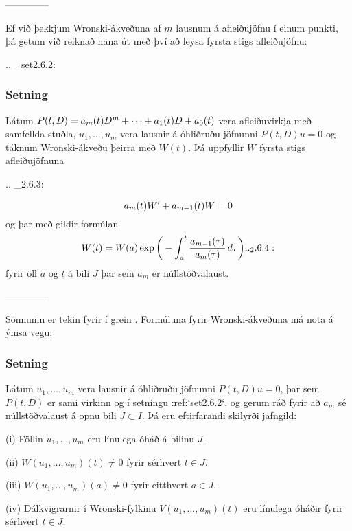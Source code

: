 --------------



Ef við þekkjum Wronski-ákveðuna af $m$ lausnum á afleiðujöfnu í einum
punkti, þá getum við reiknað hana út með því að leysa fyrsta stigs
afleiðujöfnu: 


.. _set2.6.2:

\subsubsection{Setning}
Látum
$P(t,D)=a_m(t)D\sp m+\cdots+a_1(t)D+a_0(t)$ vera afleiðuvirkja með
samfellda stuðla, $u_1,\dots,u_m$ vera lausnir á óhliðruðu jöfnunni
$P(t,D)u=0$ og táknum  Wronski-ákveðu þeirra með $W(t)$.  Þá
uppfyllir $W$ fyrsta stigs afleiðujöfnuna

.. _2.6.3:

\begin{equation*}a_m(t) W{\sp{\prime}}+a_{m-1}(t)W=0 
\end{equation*}
og þar með gildir formúlan
 \begin{equation*}W(t)=W(a)\exp\bigg(-\int_a\sp t\dfrac{a_{m-1}(\tau)}{a_m(\tau)}\,
d\tau\bigg) 

.. _2.6.4:

 \end{equation*}
fyrir öll $a$ og $t$ á bili $J$ þar sem $a_m$ er núllstöðvalaust.


--------------



Sönnunin er tekin fyrir í grein .
Formúluna fyrir Wronski-ákveðuna má nota á ýmsa vegu:

\subsubsection{Setning}
  Látum $u_1,\dots,u_m$ vera lausnir á óhliðruðu jöfnunni
$P(t,D)u=0$, þar sem $P(t,D)$ er sami virkinn og í setningu
:ref:`set2.6.2`, og gerum ráð fyrir að $a_m$ sé núllstöðvalaust á opnu bili
$J\subset I$.  Þá eru eftirfarandi skilyrði jafngild:

\item{(i)}  Föllin $u_1,\dots,u_m$ eru línulega óháð á bilinu $J$.

\item{(ii)} $W(u_1,\dots,u_m)(t)\neq 0$ fyrir sérhvert $t\in J$.

\item{(iii)} $W(u_1,\dots,u_m)(a)\neq 0$ fyrir eitthvert $a\in J$.

\item{(iv)}  Dálkvigrarnir í Wronski-fylkinu $V(u_1,\dots,u_m)(t)$  eru
línulega óháðir fyrir sérhvert $t\in J$.

